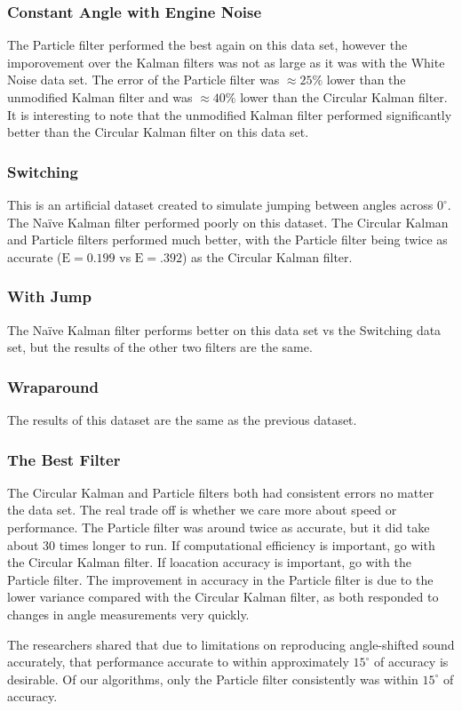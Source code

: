 \documentclass[11pt]{amsart}
\begin{document}
\subsubsection{Constant Angle with Engine Noise}
The Particle filter performed the best again on this data set, however the imporovement over the Kalman filters was not as large as it was with the White Noise data set. The error of the Particle filter was $\approx 25\%$ lower than the unmodified Kalman filter and was $\approx 40\%$ lower than the Circular Kalman filter. It is interesting to note that the unmodified Kalman filter performed significantly better than the Circular Kalman filter on this data set.
\subsubsection{Switching}
This is an artificial dataset created to simulate jumping between angles across $0^{\circ}$. The Naïve Kalman filter performed poorly on this dataset. The Circular Kalman and Particle filters performed much better, with the Particle filter being twice as accurate ($\mathrm{E}=0.199$ vs $\mathrm{E}=.392$) as the Circular Kalman filter.
\subsubsection{With Jump}
The Naïve Kalman filter performs better on this data set vs the Switching data set, but the results of the other two filters are the same.
\subsubsection{Wraparound}
The results of this dataset are the same as the previous dataset.
\subsubsection{The Best Filter}
The Circular Kalman and Particle filters both had consistent errors no matter the data set. The real trade off is whether we care more about speed or performance. The Particle filter was around twice as accurate, but it did take about 30 times longer to run. If computational efficiency is important, go with the Circular Kalman filter. If loacation accuracy is important, go with the Particle filter. The improvement in accuracy in the Particle filter is due to the lower variance compared with the Circular Kalman filter, as both responded to changes in angle measurements very quickly.

The researchers shared that due to limitations on reproducing angle-shifted sound accurately, that performance accurate to within approximately $15^{\circ}$ of accuracy is desirable. Of our algorithms, only the Particle filter consistently was within $15^{\circ}$ of accuracy.
\end{document}
